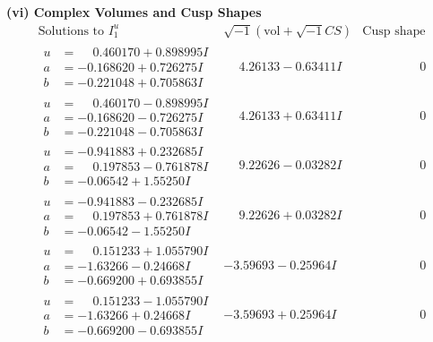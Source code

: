 \documentclass[1p]{elsarticle_modified}
\theoremstyle{definition}
\newcommand{\I}{\sqrt{-1}}
\begin{document}
\newpage\flushleft \textbf{(vi) Complex Volumes and Cusp Shapes}
$$\begin{array}{c|c|c}  
\text{Solutions to }I^u_{1}& \I (\text{vol} + \sqrt{-1}CS) & \text{Cusp shape}\\
 \hline 
\begin{aligned}
u &= \phantom{-}0.460170 + 0.898995 I \\
a &= -0.168620 + 0.726275 I \\
b &= -0.221048 + 0.705863 I\end{aligned}
 & \phantom{-}4.26133 - 0.63411 I & \phantom{-0.000000 } 0 \\ \hline\begin{aligned}
u &= \phantom{-}0.460170 - 0.898995 I \\
a &= -0.168620 - 0.726275 I \\
b &= -0.221048 - 0.705863 I\end{aligned}
 & \phantom{-}4.26133 + 0.63411 I & \phantom{-0.000000 } 0 \\ \hline\begin{aligned}
u &= -0.941883 + 0.232685 I \\
a &= \phantom{-}0.197853 - 0.761878 I \\
b &= -0.06542 + 1.55250 I\end{aligned}
 & \phantom{-}9.22626 - 0.03282 I & \phantom{-0.000000 } 0 \\ \hline\begin{aligned}
u &= -0.941883 - 0.232685 I \\
a &= \phantom{-}0.197853 + 0.761878 I \\
b &= -0.06542 - 1.55250 I\end{aligned}
 & \phantom{-}9.22626 + 0.03282 I & \phantom{-0.000000 } 0 \\ \hline\begin{aligned}
u &= \phantom{-}0.151233 + 1.055790 I \\
a &= -1.63266 - 0.24668 I \\
b &= -0.669200 + 0.693855 I\end{aligned}
 & -3.59693 - 0.25964 I & \phantom{-0.000000 } 0 \\ \hline\begin{aligned}
u &= \phantom{-}0.151233 - 1.055790 I \\
a &= -1.63266 + 0.24668 I \\
b &= -0.669200 - 0.693855 I\end{aligned}
 & -3.59693 + 0.25964 I & \phantom{-0.000000 } 0 \\ \hline\begin{aligned}

\end{aligned}
\end{array}$$
\end{document}
